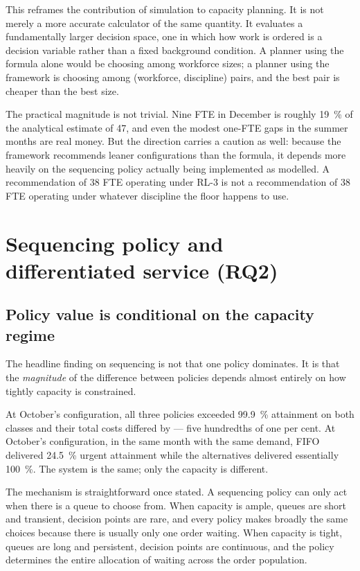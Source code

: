 This reframes the contribution of simulation to capacity planning. It is not merely a more
accurate calculator of the same quantity. It evaluates a fundamentally larger decision space,
one in which how work is ordered is a decision variable rather than a fixed background
condition. A planner using the formula alone would be choosing among workforce sizes; a planner
using the framework is choosing among (workforce, discipline) pairs, and the best pair is
cheaper than the best size.

The practical magnitude is not trivial. Nine FTE in December is roughly \SI{19}{\percent} of
the analytical estimate of 47, and even the modest one-FTE gaps in the summer months are real
money. But the direction carries a caution as well: because the framework
recommends leaner configurations than the formula, it depends more heavily on the sequencing
policy actually being implemented as modelled. A recommendation of 38 FTE operating under RL-3
is not a recommendation of 38 FTE operating under whatever discipline the floor happens to use.

\section{Sequencing policy and differentiated service (RQ2)}
\label{sec:disc-policy}

\subsection{Policy value is conditional on the capacity regime}

The headline finding on sequencing is not that one policy dominates. It is that the
\emph{magnitude} of the difference between policies depends almost entirely on how tightly
capacity is constrained.

At October's  configuration, all three policies exceeded \SI{99.9}{\percent}
attainment on both classes and their total costs differed by  --- five hundredths of
one per cent. At October's  configuration, in the same month with the same demand,
FIFO delivered \SI{24.5}{\percent} urgent attainment while the alternatives delivered essentially
\SI{100}{\percent}. The system is the same; only the capacity is different.

The mechanism is straightforward once stated. A sequencing policy can only act when there is a
queue to choose from. When capacity is ample, queues are short and transient, decision points
are rare, and every policy makes broadly the same choices because there is usually only one
order waiting. When capacity is tight, queues are long and persistent, decision points are
continuous, and the policy determines the entire allocation of waiting across the order
population.

